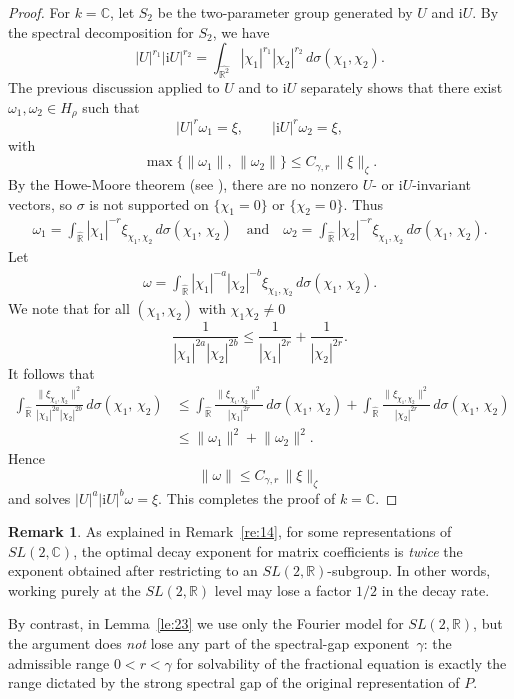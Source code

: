 \documentclass[11 pt]{amsart}
\newcommand{\RR}{\mathbb{R}}
\newcommand{\CC}{\mathbb{C}}
\newcommand{\norm}[1]{\lVert#1\rVert}
\theoremstyle{definition}
\newtheorem{remark}[theorem]{Remark}
\numberwithin{equation}{section}
\begin{document}
\begin{proof}
  For $k=\CC$, let $S_2$ be the two-parameter group generated by $U$ and $\textrm{i}U$. By the spectral decomposition for $S_2$, we have
\[
  |U|^{r_1} |\textrm{i} U|^{r_2}= \int_{\widehat{\RR^2}} |\chi_1|^{r_1}|\chi_2|^{r_2}\,d\sigma(\chi_1,\chi_2).
\]
The previous discussion applied to $U$ and to $\mathrm{i}U$ separately shows
that there exist $\omega_1,\omega_2\in H_\rho$ such that
\[
    |U|^{r}\omega_1=\xi,\qquad |\mathrm{i} U|^{r}\omega_2=\xi,
\]
 with
\[
  \max\{\|\omega_1\|,\, \|\omega_2\|\}\leq C_{\gamma,r}\,\|\xi\|_{\zeta}.
\]
 By the Howe-Moore theorem (see \cite{howe-moore}), there are no nonzero
$U$- or $\mathrm{i}U$-invariant vectors, so $\sigma$ is not supported on
$\{\chi_1=0\}$ or $\{\chi_2=0\}$. Thus
  \begin{align*}
 \omega_1=\int_{\widehat{\RR}} |\chi_1|^{-r}\xi_{\chi_1,\chi_2}\,d\sigma(\chi_1,\,\chi_2)\quad\text{and}\quad \omega_2=\int_{\widehat{\RR}} |\chi_2|^{-r}\xi_{\chi_1,\chi_2}\,d\sigma(\chi_1,\,\chi_2).
\end{align*}
Let
\begin{align*}
 \omega=\int_{\widehat{\RR}} |\chi_1|^{-a}|\chi_2|^{-b}\xi_{\chi_1,\chi_2}\,d\sigma(\chi_1,\,\chi_2).
\end{align*}
We note that for all $(\chi_1,\chi_2)$ with $\chi_1\chi_2\neq 0$
\[
\frac{1}{|\chi_1|^{2a} |\chi_2|^{2b}}
\leq\frac{1}{|\chi_1|^{2r}} + \frac{1}{|\chi_2|^{2r}}.
\]
It follows that
\begin{align*}
   \int_{\widehat{\RR}} \frac{\norm{\xi_{\chi_1,\chi_2}}^2}{|\chi_1|^{2a}|\chi_2|^{2b}}\,d\sigma(\chi_1,\,\chi_2)
   &\leq \int_{\widehat{\RR}} \frac{\norm{\xi_{\chi_1,\chi_2}}^2}{|\chi_1|^{2r}}\,d\sigma(\chi_1,\,\chi_2)+\int_{\widehat{\RR}} \frac{\norm{\xi_{\chi_1,\chi_2}}^2}{|\chi_2|^{2r}}\,d\sigma(\chi_1,\,\chi_2)\\
   &\leq \norm{\omega_1}^2+\norm{\omega_2}^2.
  \end{align*}
Hence
\[
 \|\omega\|\leq C_{\gamma,r}\,\|\xi\|_{\zeta}
\]
and solves $|U|^{a}|\textrm{i} U|^{b}\omega=\xi$. This completes the proof of $k=\CC$.


\end{proof}

\begin{remark}
As explained in Remark~\ref{re:14}, for some representations of
$SL(2,\CC)$, the optimal decay exponent for matrix coefficients is
\emph{twice} the exponent obtained after restricting to an
$SL(2,\RR)$-subgroup. In other words, working purely at the
$SL(2,\RR)$ level may lose a factor \(1/2\) in the decay rate.

By contrast, in Lemma~\ref{le:23} we use only the Fourier model for
$SL(2,\RR)$, but the argument does \emph{not} lose any part of the
spectral-gap exponent~\(\gamma\): the admissible range \(0<r<\gamma\)
for solvability of the fractional equation is exactly the range dictated
by the strong spectral gap of the original representation of \(P\).
\end{remark}
\end{document}
